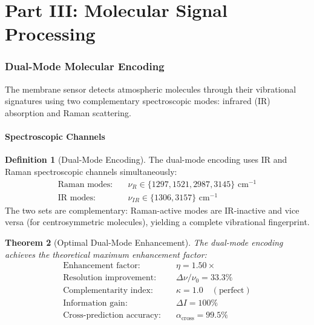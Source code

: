 \documentclass[twocolumn,10pt,a4paper]{article}
\newtheorem{theorem}{Theorem}[section]
\theoremstyle{definition}
\newtheorem{definition}[theorem]{Definition}
\theoremstyle{remark}
\begin{document}

\part*{Part III: Molecular Signal Processing}

\section{Dual-Mode Molecular Encoding}
\label{sec:dual_mode}

The membrane sensor detects atmospheric molecules through their vibrational signatures using two complementary spectroscopic modes: infrared (IR) absorption and Raman scattering.

\subsection{Spectroscopic Channels}

\begin{definition}[Dual-Mode Encoding]
\label{def:dual_mode}
The dual-mode encoding uses IR and Raman spectroscopic channels simultaneously:
\begin{align}
\text{Raman modes:} &\quad \nu_R \in \{1297, 1521, 2987, 3145\} \text{ cm}^{-1} \label{eq:raman_modes} \\
\text{IR modes:} &\quad \nu_{IR} \in \{1306, 3157\} \text{ cm}^{-1} \label{eq:ir_modes}
\end{align}
The two sets are complementary: Raman-active modes are IR-inactive and vice versa (for centrosymmetric molecules), yielding a complete vibrational fingerprint.
\end{definition}

\begin{theorem}[Optimal Dual-Mode Enhancement]
\label{thm:enhancement}
The dual-mode encoding achieves the theoretical maximum enhancement factor:
\begin{align}
\text{Enhancement factor:} &\quad \eta = 1.50\times \label{eq:enhancement} \\
\text{Resolution improvement:} &\quad \Delta\nu/\nu_0 = 33.3\% \label{eq:resolution} \\
\text{Complementarity index:} &\quad \kappa = 1.0 \quad (\text{perfect}) \label{eq:complementarity} \\
\text{Information gain:} &\quad \Delta I = 100\% \label{eq:info_gain} \\
\text{Cross-prediction accuracy:} &\quad \alpha_{\mathrm{cross}} = 99.5\% \label{eq:cross_prediction}
\end{align}
\end{theorem}
\end{document}
